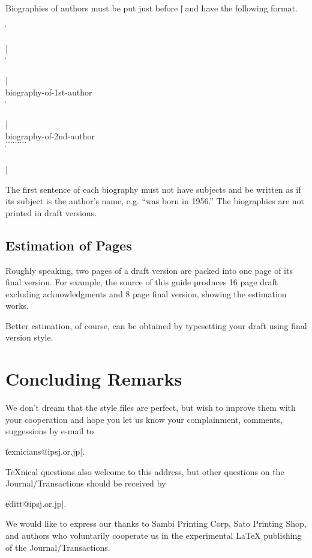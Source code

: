 Biographies of authors must be put just before \|| and have
the following format.
%
\begin{Quote}
\|\begin{biography}|\\
\|\author{|\<1st-author's-name\>\|}|\\
\mbox{}\quad\<biography-of-1st-author\>\\
\|\author{|\<2nd-author's-name\>\|}|\\
\mbox{}\quad\<biography-of-2nd-author\>\\
\mbox{}\quad $\ldots\ldots\ldots$ \\
\|\end{biography}|
\end{Quote}
%
The first sentence of each biography must not have subjects and be written
as if its subject is the author's name, e.g. ``was born in 1956.''  The
biographies are not printed in draft versions.


\subsection{Estimation of Pages}

Roughly speaking, two pages of a draft version are packed into one page of
its final version.  For example, the source of this guide produces 16 page
draft excluding acknowledgments and 8 page final version, showing the
estimation works.

Better estimation, of course, can be obtained by typesetting your draft
using final version style.


\section{Concluding Remarks}

We don't dream that the style files are perfect, but wish to improve them
with your cooperation and hope you let us know your complainment, comments,
suggessions by e-mail to
%
\begin{Quote}
\|texnicians@ipsj.or.jp|.
\end{Quote}
{\TeX}nical questions also welcome to this address, but other questions on the
Journal\slash Transactions should be received by
\begin{Quote}
\|editt@ipsj.or.jp|.
\end{Quote}

\begin{acknowledgment}
We would like to express our thanks to Sambi Printing Corp, Sato Printing
Shop, and authors who voluntarily cooperate us in the experimental {\LaTeX}
publishing of the Journal\slash Transactions.
\end{acknowledgment}

